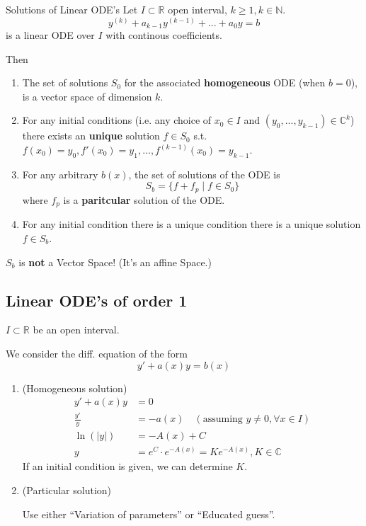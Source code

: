 \documentclass[a4paper,fontsize = 8pt]{scrartcl}
\def\R{\mathbb{R}}
\def\C{\mathbb{C}}
\def\N{\mathbb{N}}
\begin{document}
\begin{mainbox}{Solutions of Linear ODE's}
    Let $I \subset \R$ open interval, $k \geq 1, k \in \N$.
    $$y^{(k)}+a_{k-1}y^{(k-1)} + ... + a_0y = b$$
    is a linear ODE over $I$ with continous coefficients.
    
    Then
    \begin{enumerate}
        \item The set of solutions $S_0$ for the associated \textbf{homogeneous} ODE (when $b = 0$), is a vector space of dimension $k$.
        \item For any initial conditions (i.e. any choice of $x_0 \in I$ and $(y_0, ..., y_{k-1}) \in \C^k$) there exists an \textbf{unique} solution $f \in S_0$ s.t. $f(x_0) = y_0, f'(x_0) = y_1, ..., f^{(k-1)}(x_0) = y_{k-1}$.
        \item For any arbitrary $b(x)$, the set of solutions of the ODE is $$S_b = \{f + f_p \mid f \in S_0\}$$ where $f_p$ is a \textbf{paritcular} solution of the ODE.
        \item For any initial condition there is a unique condition there is a unique solution $f \in S_b$.
    \end{enumerate}
     $S_b$ is \textbf{not} a Vector Space! (It's an affine Space.)
\end{mainbox}

\subsection{Linear ODE's of order 1}
$I \subset \R$ be an open interval.

We consider the diff. equation of the form \[y' + a(x)y = b(x)\]
\begin{enumerate}
  \item (Homogeneous solution) 
  \begin{align*}
    y' + a(x)y &= 0\\
    \frac{y'}{y} &= -a(x) \quad (\text{assuming } y \neq 0, \forall x \in I)\\
    \ln(|y|) &= -A(x)+C\\
    y &= e^C \cdot e^{-A(x)} = Ke^{-A(x)}, K \in \C
  \end{align*}
  If an initial condition is given, we can determine $K$.
  \item (Particular solution) 
  
  Use either ``Variation of parameters'' or ``Educated guess''.
\end{enumerate}
\end{document}
